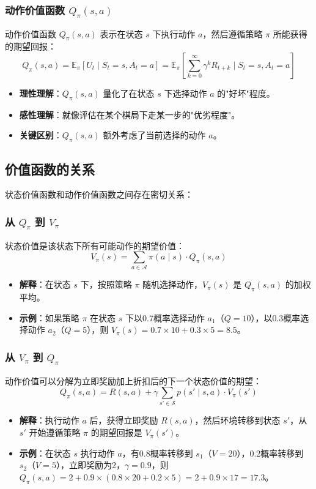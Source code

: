 \subsubsection{动作价值函数 $Q_\pi(s, a)$}

\begin{definition}
动作价值函数 $Q_\pi(s, a)$ 表示在状态 $s$ 下执行动作 $a$，然后遵循策略 $\pi$ 所能获得的期望回报：
\[
Q_\pi(s, a) = \mathbb{E}_\pi[U_t \mid S_t = s, A_t = a] = \mathbb{E}_\pi\left[\sum_{k=0}^\infty \gamma^k R_{t+k} \mid S_t = s, A_t = a\right]
\]
\begin{itemize}
    \item \textbf{理性理解}：$Q_\pi(s, a)$ 量化了在状态 $s$ 下选择动作 $a$ 的"好坏"程度。
    \item \textbf{感性理解}：就像评估在某个棋局下走某一步的"优劣程度"。
    \item \textbf{关键区别}：$Q_\pi(s, a)$ 额外考虑了当前选择的动作 $a$。
\end{itemize}
\end{definition}

\subsection{价值函数的关系}

状态价值函数和动作价值函数之间存在密切关系：

\subsubsection{从 $Q_\pi$ 到 $V_\pi$}
状态价值是该状态下所有可能动作的期望价值：
\[
V_\pi(s) = \sum_{a \in \mathcal{A}} \pi(a \mid s) \cdot Q_\pi(s, a)
\]
\begin{itemize}
    \item \textbf{解释}：在状态 $s$ 下，按照策略 $\pi$ 随机选择动作，$V_\pi(s)$ 是 $Q_\pi(s, a)$ 的加权平均。
    \item \textbf{示例}：如果策略 $\pi$ 在状态 $s$ 下以0.7概率选择动作 $a_1$（$Q=10$），以0.3概率选择动作 $a_2$（$Q=5$），则 $V_\pi(s) = 0.7 \times 10 + 0.3 \times 5 = 8.5$。
\end{itemize}

\subsubsection{从 $V_\pi$ 到 $Q_\pi$}
动作价值可以分解为立即奖励加上折扣后的下一个状态价值的期望：
\[
Q_\pi(s, a) = R(s, a) + \gamma \sum_{s' \in \mathcal{S}} p(s' \mid s, a) \cdot V_\pi(s')
\]
\begin{itemize}
    \item \textbf{解释}：执行动作 $a$ 后，获得立即奖励 $R(s, a)$，然后环境转移到状态 $s'$，从 $s'$ 开始遵循策略 $\pi$ 的期望回报是 $V_\pi(s')$。
    \item \textbf{示例}：在状态 $s$ 执行动作 $a$，有0.8概率转移到 $s_1$（$V=20$），0.2概率转移到 $s_2$（$V=5$），立即奖励为2，$\gamma=0.9$，则 $Q_\pi(s, a) = 2 + 0.9 \times (0.8 \times 20 + 0.2 \times 5) = 2 + 0.9 \times 17 = 17.3$。
\end{itemize}

